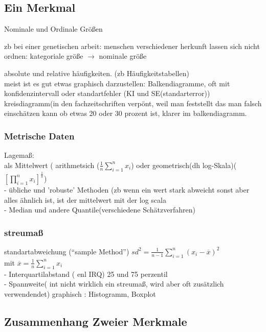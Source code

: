 \documentclass[a4paper]{article}
\theoremstyle{definition}
\theoremstyle{remark}
\begin{document}
\subsection{Ein Merkmal}
\label{sub:ein_merkmal}

Nominale und Ordinale Größen

zb bei einer genetischen arbeit: menschen verschiedener herkunft lassen sich nicht ordnen: kategoriale größe $ \rightarrow $  nominale größe 

absolute und relative häufigkeiten. (zb Häufigkeitstabellen)\\
meist ist es gut etwas graphisch  darzustellen: Balkendiagramme, oft mit konfidenzintervall oder standartfehler (KI und SE(standarterror))
kreisdiagramm(in den fachzeitschriften verpönt, weil man feststellt das man falsch einschätzen kann ob etwas 20 oder 30 prozent ist, klarer im balkendiagramm.
\subsubsection{Metrische Daten}
\label{sub:metrische_daten}

Lagemaß:\\
als Mittelwert ( arithmetsich ($ \frac{1}{n}\sum_{i=1}^{n}x_i$) oder geometrisch(dh log-Skala)($ \left[ \prod_{i=1}^{n}x_i \right]^{\frac{1}{n}}$)\\
- übliche und 'robuste' Methoden (zb wenn ein wert stark abweicht sonst aber alles ähnlich ist, ist der mittelwert mit der log scala \\
  - Median und andere Quantile(verschiedene Schätzverfahren) 
\subsubsection{streumaß}
\label{ssub:streumass}

standartabweichung (``sample Method'') $ sd^2= \frac{1}{n-1}\sum_{i=1}^{n}(x_i-\overline{x})^2$\\
mit $ \overline{x}=\frac{1}{n}\sum_{i=1}^{n}x_i$\\
- Interquartilabstand ( enl IRQ) 25 und 75 perzentil\\
- Spannweite( int nicht wirklich ein streumaß, wird aber oft zusätzlich verwendendet)
graphisch : Histogramm, Boxplot
\subsection{Zusammenhang Zweier Merkmale}
\label{sub:zusammenhang_zweier_merkmale}
\end{document}
